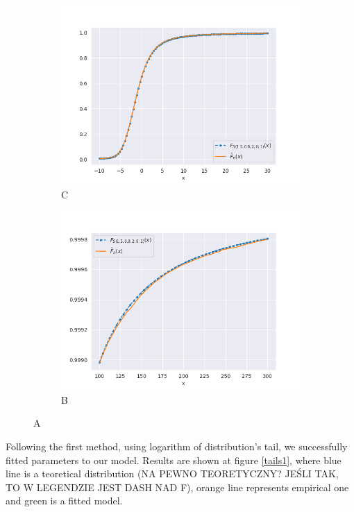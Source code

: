 \documentclass{article}
\begin{document}
		\begin{figure}	
			\begin{subfigure}[h]{.5\textwidth}
				\centering
				\includegraphics[width=1\linewidth]{images/stable_CDF.png}
				\caption{C}
			\end{subfigure}
			\begin{subfigure}[r]{.5\textwidth}
				\centering
				\includegraphics[width=1\linewidth]{images/stable_CDF_large_x.png}
				\caption{B}
			\end{subfigure}
			\caption{A}\label{stable_cdf}
		\end{figure}

		Following the first method, using logarithm of distribution's tail, we successfully fitted parameters to our model. Results are shown at figure \ref{tails1}, where blue line is a teoretical distribution (NA PEWNO TEORETYCZNY? JEŚLI TAK, TO W LEGENDZIE JEST DASH NAD F), orange line represents empirical one and green is a fitted model.
		
\end{document}
